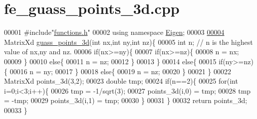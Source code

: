\hypertarget{fe__guass__points__3d_8cpp_source}{}\section{fe\+\_\+guass\+\_\+points\+\_\+3d.\+cpp}
\label{fe__guass__points__3d_8cpp_source}

\begin{DoxyCode}
00001 \textcolor{preprocessor}{#include"\hyperlink{functions_8h}{functions.h}"}
00002 \textcolor{keyword}{using namespace }\hyperlink{namespace_eigen}{Eigen};
00003 
\hyperlink{fe__guass__points__3d_8cpp_a502e3469e1cc253deb142f46c0789a78}{00004} MatrixXd \hyperlink{fe__guass__points__3d_8cpp_a502e3469e1cc253deb142f46c0789a78}{guass\_points\_3d}(\textcolor{keywordtype}{int} nx,\textcolor{keywordtype}{int} ny,\textcolor{keywordtype}{int} nz)\{
00005     \textcolor{keywordtype}{int} n; \textcolor{comment}{// n is the highest value of nx,ny and nz.}
00006     \textcolor{keywordflow}{if}(nx>=ny)\{
00007         \textcolor{keywordflow}{if}(nx>=nz)\{
00008             n = nx;
00009         \}
00010         \textcolor{keywordflow}{else}\{
00011             n = nz;
00012         \}
00013     \}
00014     \textcolor{keywordflow}{else}\{
00015         \textcolor{keywordflow}{if}(ny>=nz)\{
00016             n = ny;
00017         \}
00018         \textcolor{keywordflow}{else}\{
00019         n = nz;
00020         \}
00021     \}
00022     MatrixXd points\_3d(3,2);
00023     \textcolor{keywordtype}{double} tmp;
00024     \textcolor{keywordflow}{if}(n==2)\{
00025         \textcolor{keywordflow}{for}(\textcolor{keywordtype}{int} i=0;i<3;i++)\{
00026             tmp = -1/sqrt(3);
00027             points\_3d(i,0) = tmp;
00028             tmp = -tmp;
00029             points\_3d(i,1) = tmp;
00030         \}
00031     \}
00032     \textcolor{keywordflow}{return} points\_3d;
00033 \}
\end{DoxyCode}

